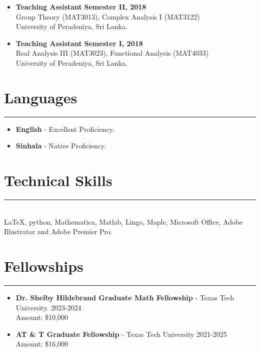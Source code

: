 \documentclass[12pt]{book}
\begin{document}
\begin{itemize}
\item \textbf{Teaching Assistant} \hfill \textbf{Semester II, 2018}\\
Group Theory (MAT3013), Complex Analysis I (MAT3122)\\
University of Peradeniya, Sri Lanka.

\item \textbf{Teaching Assistant} \hfill \textbf{Semester I, 2018}\\
Real Analysis III (MAT3023), Functional Analysis (MAT4033)\\
University of Peradeniya, Sri Lanka. 
\end{itemize}
















\section*{Languages}
\rule{\textwidth}{1pt}
\begin{itemize}
	\item \textbf{English} - Excellent Proficiency.
	\item \textbf{Sinhala} - Native Proficiency. 
\end{itemize}


\section*{Technical Skills}
\rule{\textwidth}{1pt}\\

\LaTeX, python, Mathematica, Matlab, Lingo, Maple, Microsoft Office, Adobe Illustrator and Adobe Premier Pro. \\






\section*{Fellowships}
\rule{\textwidth}{1pt}
\begin{itemize}
	\item \textbf{Dr. Shelby Hildebrand Graduate Math Fellowship}  - Texas Tech University.   \hfill 2023-2024\\
	Amount: \$10,000
	\item \textbf{AT \& T Graduate Fellowship} - Texas Tech University \hfill 2021-2025\\
	Amount: \$16,000
\end{itemize}
\end{document}
